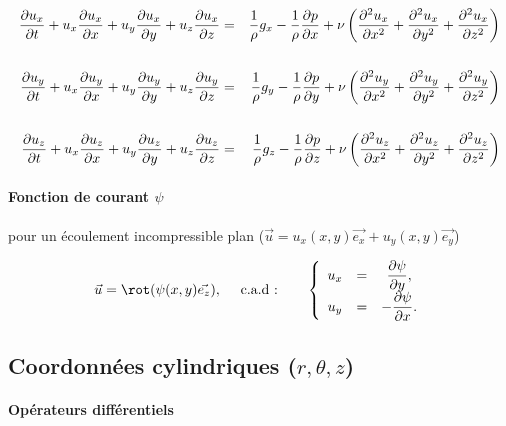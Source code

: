 \begin{eqnarray*}
\dpa{u_x}{t} + u_x \dpa{u_x}{x} + u_y \dpa{u_x}{y} + u_z \dpa{u_x}{z} & = &
\frac{1}{\rho} g_x - \frac{1}{\rho} \dpa{p}{x}
+ \nu \left ( \ddpa{u_x}{x} + \ddpa{u_x}{y} + \ddpa{u_x}{z} \right )
\\ & & \\
\dpa{u_y}{t} + u_x \dpa{u_y}{x} + u_y \dpa{u_y}{y} + u_z \dpa{u_y}{z} & = &
\frac{1}{\rho} g_y - \frac{1}{\rho} \dpa{p}{y}
+ \nu \left ( \ddpa{u_y}{x} + \ddpa{u_y}{y} + \ddpa{u_y}{z} \right )
\\ & & \\
\dpa{u_z}{t} + u_x \dpa{u_z}{x} + u_y \dpa{u_z}{y} + u_z \dpa{u_z}{z} & = &
\frac{1}{\rho} g_z - \frac{1}{\rho} \dpa{p}{z}
+ \nu \left ( \ddpa{u_z}{x} + \ddpa{u_z}{y} + \ddpa{u_z}{z} \right )
\end{eqnarray*}


\paragraph{Fonction de courant $\psi$ } pour un écoulement incompressible plan 
($\vec{u} = u_x(x,y) \vec{e_x} + u_y(x,y) \vec{e_y}$)


\begin{equation}
 \vec{u} = \rot (\psi(x,y) \vec{e_z}), 
\quad \mbox{ c.a.d :} \quad \quad 
\left\{
\begin{array}{ccc}
 u_x &=& \displaystyle \dpa{\psi}{y}, \\
 u_y &=& \displaystyle -\dpa{\psi}{x}.
\end{array}
\right.
\end{equation}







\clearpage


\subsection{Coordonn\'ees cylindriques ($r,\theta,z$)}

\vspace{5mm}

\paragraph{Opérateurs différentiels}

